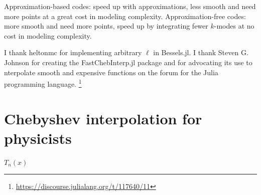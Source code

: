 \documentclass{aa}
\begin{document}
Approximation-based codes: speed up with approximations, less smooth and need more points at a great cost in modeling complexity.
Approximation-free codes: more smooth and need more points, speed up by integrating fewer $k$-modes at no cost in modeling complexity.

\begin{acknowledgements}
	I thank heltonmc for implementing arbitrary $\ell$ in Bessels.jl.
	I thank Steven G. Johnson for creating the FastChebInterp.jl package and for advocating its use to 
nterpolate smooth and expensive functions on the forum for the Julia programming language.%
	\footnote{\url{https://discourse.julialang.org/t/117640/11}}
\end{acknowledgements}




\appendix
\onecolumn

\section{Chebyshev interpolation for physicists}
\label{sec:chebyshev}

$T_n(x)$
\end{document}

